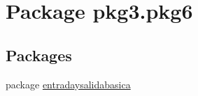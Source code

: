 \hypertarget{namespacepkg3_1_1pkg6}{}\section{Package pkg3.\+pkg6}
\label{namespacepkg3_1_1pkg6}
\subsection*{Packages}
\begin{DoxyCompactItemize}
\item 
package \mbox{\hyperlink{namespacepkg3_1_1pkg6_1_1entradaysalidabasica}{entradaysalidabasica}}
\end{DoxyCompactItemize}
